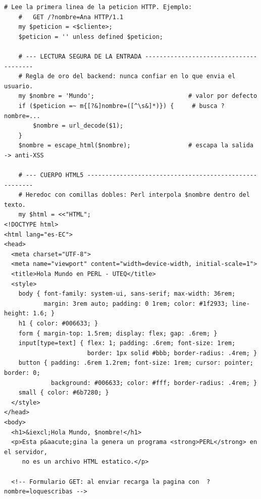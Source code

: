 \documentclass[11pt]{article}
\begin{document}
\begin{cajacodigo}
\begin{lstlisting}[style=perl]
    # Lee la primera linea de la peticion HTTP. Ejemplo:
    #   GET /?nombre=Ana HTTP/1.1
    my $peticion = <$cliente>;
    $peticion = '' unless defined $peticion;

    # --- LECTURA SEGURA DE LA ENTRADA ---------------------------------------
    # Regla de oro del backend: nunca confiar en lo que envia el usuario.
    my $nombre = 'Mundo';                          # valor por defecto
    if ($peticion =~ m{[?&]nombre=([^\s&]*)}) {     # busca ?nombre=...
        $nombre = url_decode($1);
    }
    $nombre = escape_html($nombre);                # escapa la salida -> anti-XSS

    # --- CUERPO HTML5 -------------------------------------------------------
    # Heredoc con comillas dobles: Perl interpola $nombre dentro del texto.
    my $html = <<"HTML";
<!DOCTYPE html>
<html lang="es-EC">
<head>
  <meta charset="UTF-8">
  <meta name="viewport" content="width=device-width, initial-scale=1">
  <title>Hola Mundo en PERL - UTEQ</title>
  <style>
    body { font-family: system-ui, sans-serif; max-width: 36rem;
           margin: 3rem auto; padding: 0 1rem; color: #1f2933; line-height: 1.6; }
    h1 { color: #006633; }
    form { margin-top: 1.5rem; display: flex; gap: .6rem; }
    input[type=text] { flex: 1; padding: .6rem; font-size: 1rem;
                       border: 1px solid #bbb; border-radius: .4rem; }
    button { padding: .6rem 1.2rem; font-size: 1rem; cursor: pointer; border: 0;
             background: #006633; color: #fff; border-radius: .4rem; }
    small { color: #6b7280; }
  </style>
</head>
<body>
  <h1>&iexcl;Hola Mundo, $nombre!</h1>
  <p>Esta p&aacute;gina la genera un programa <strong>PERL</strong> en el servidor,
     no es un archivo HTML estatico.</p>

  <!-- Formulario GET: al enviar recarga la pagina con  ?nombre=loquescribas -->
\end{lstlisting}
\end{cajacodigo}
\vspace{2pt}
\end{document}
